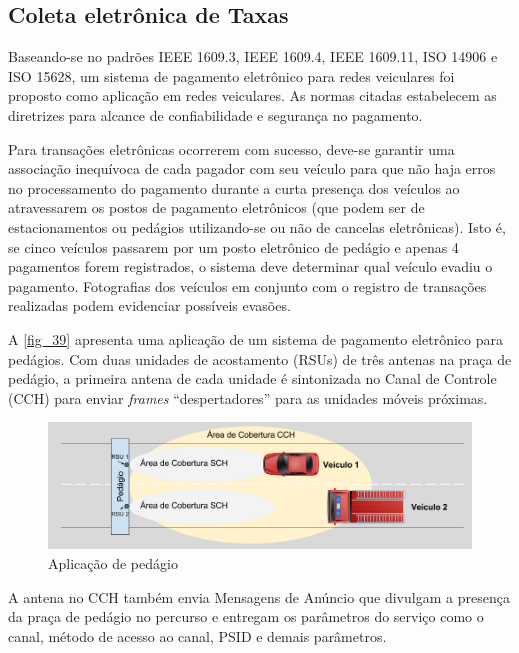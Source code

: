 \documentclass[
12pt,				%
openright,			%
oneside,			%
a4paper,			%
brazil,				%
]{abntex2}
\begin{document}
	\subsection{Coleta eletrônica de Taxas}
	
	\par Baseando-se no padrões IEEE 1609.3, IEEE 1609.4, IEEE 1609.11, ISO 14906 e ISO 15628, um sistema de pagamento eletrônico para redes veiculares foi proposto como aplicação em redes veiculares. As normas citadas estabelecem as diretrizes para alcance de confiabilidade e segurança no pagamento. 
	
	\par Para transações eletrônicas ocorrerem com sucesso, deve-se garantir uma associação inequívoca de cada pagador com seu veículo para que não haja erros no processamento do pagamento durante a curta presença dos veículos ao atravessarem os postos de pagamento eletrônicos (que podem ser de estacionamentos ou pedágios utilizando-se ou não de cancelas eletrônicas). Isto é, se cinco veículos passarem por um posto eletrônico de pedágio e apenas 4 pagamentos forem registrados, o sistema deve determinar qual veículo evadiu o pagamento. Fotografias dos veículos em conjunto com o registro de transações realizadas podem evidenciar possíveis evasões.
	
	\par A \autoref{fig_39} apresenta uma aplicação de um sistema de pagamento eletrônico para pedágios. Com duas unidades de acostamento (RSUs) de três antenas na praça de pedágio, a primeira antena de cada unidade é sintonizada no Canal de Controle (CCH) para enviar \textit{frames} “despertadores” para as unidades móveis próximas.
	
	\begin{figure} [H]
		\centering
		\includegraphics[scale=.4]{figuras/cap3/39AplicacaoPedagio}
		\caption{\label{fig_39}Aplicação de pedágio}
	\end{figure}
	
	\par A antena no CCH também envia Mensagens de Anúncio que divulgam a presença da praça de pedágio no percurso e entregam os parâmetros do serviço como o canal, método de acesso ao canal, PSID e demais parâmetros.
	
\end{document}
